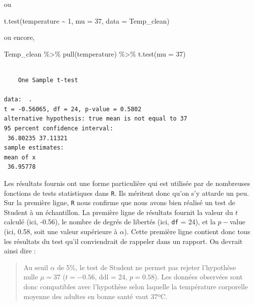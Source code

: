 \documentclass[
  a4paper,
  DIV=11,
  numbers=noendperiod,
  oneside]{scrreprt}
\newenvironment{Shaded}{}{}
\newcommand{\AttributeTok}[1]{\textcolor[rgb]{0.84,0.23,0.29}{#1}}
\newcommand{\DecValTok}[1]{\textcolor[rgb]{0.00,0.36,0.77}{#1}}
\newcommand{\FunctionTok}[1]{\textcolor[rgb]{0.44,0.26,0.76}{#1}}
\newcommand{\NormalTok}[1]{\textcolor[rgb]{0.14,0.16,0.18}{#1}}
\newcommand{\SpecialCharTok}[1]{\textcolor[rgb]{0.00,0.36,0.77}{#1}}
\begin{document}
ou

\begin{Shaded}
\begin{Highlighting}[]
\FunctionTok{t.test}\NormalTok{(temperature }\SpecialCharTok{\textasciitilde{}} \DecValTok{1}\NormalTok{, }\AttributeTok{mu =} \DecValTok{37}\NormalTok{, }\AttributeTok{data =}\NormalTok{ Temp\_clean)}
\end{Highlighting}
\end{Shaded}

ou encore,

\begin{Shaded}
\begin{Highlighting}[]
\NormalTok{Temp\_clean }\SpecialCharTok{\%\textgreater{}\%}
  \FunctionTok{pull}\NormalTok{(temperature) }\SpecialCharTok{\%\textgreater{}\%}
  \FunctionTok{t.test}\NormalTok{(}\AttributeTok{mu =} \DecValTok{37}\NormalTok{)}
\end{Highlighting}
\end{Shaded}

\begin{verbatim}

    One Sample t-test

data:  .
t = -0.56065, df = 24, p-value = 0.5802
alternative hypothesis: true mean is not equal to 37
95 percent confidence interval:
 36.80235 37.11321
sample estimates:
mean of x 
 36.95778 
\end{verbatim}

Les résultats fournis ont une forme particulière qui est utilisée par de
nombreuses fonctions de tests statistiques dans \texttt{R}. Ils méritent
donc qu'on s'y attarde un peu.\\
Sur la première ligne, \texttt{R} nous confirme que nous avons bien
réalisé un test de Student à un échantillon. La première ligne de
résultats fournit la valeur du \(t\) calculé (ici, -0.56), le nombre de
degrés de libertés (ici, \texttt{df} = 24), et la \(p-\)value (ici,
0.58, soit une valeur supérieure à \(\alpha\)). Cette première ligne
contient donc tous les résultats du test qu'il conviendrait de rappeler
dans un rapport. On devrait ainsi dire :

\begin{quote}
Au seuil \(\alpha\) de 5\%, le test de Student ne permet pas rejeter
l'hypothèse nulle \(\mu = 37\) (\(t = -0.56\), ddl = 24, \(p = 0.58\)).
Les données observées sont donc compatibles avec l'hypothèse selon
laquelle la température corporelle moyenne des adultes en bonne santé
vaut 37ºC.
\end{quote}
\end{document}
